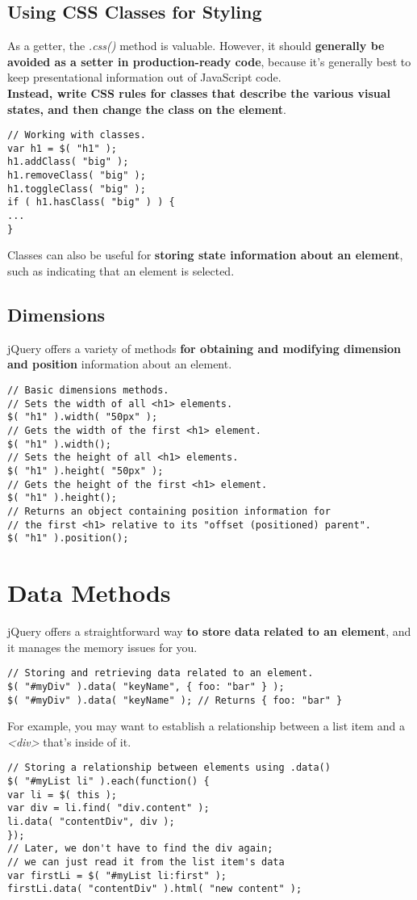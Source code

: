 \documentclass[10pt,letterpaper]{book}
\begin{document}
\subsection{Using CSS Classes for Styling}
As a getter, the \textit{.css()} method is valuable. However, it should \textbf{generally be avoided as a setter in production-ready code}, because it's generally best to keep presentational information out of JavaScript code.\\
\textbf{Instead, write CSS rules for classes that describe the various visual states, and then change the class on the element}.
\begin{lstlisting}
// Working with classes.
var h1 = $( "h1" );
h1.addClass( "big" );
h1.removeClass( "big" );
h1.toggleClass( "big" );
if ( h1.hasClass( "big" ) ) {
...
}
\end{lstlisting}
Classes can also be useful for \textbf{storing state information about an element}, such as indicating that an element is selected.
\subsection{Dimensions}
jQuery offers a variety of methods \textbf{for obtaining and modifying dimension and position} information about an element.
\begin{lstlisting}
// Basic dimensions methods.
// Sets the width of all <h1> elements.
$( "h1" ).width( "50px" );
// Gets the width of the first <h1> element.
$( "h1" ).width();
// Sets the height of all <h1> elements.
$( "h1" ).height( "50px" );
// Gets the height of the first <h1> element.
$( "h1" ).height();
// Returns an object containing position information for
// the first <h1> relative to its "offset (positioned) parent".
$( "h1" ).position();
\end{lstlisting}
\section{Data Methods}
 jQuery offers a straightforward way \textbf{to store data related to an element}, and it manages the memory issues for you.
\begin{lstlisting}
// Storing and retrieving data related to an element.
$( "#myDiv" ).data( "keyName", { foo: "bar" } );
$( "#myDiv" ).data( "keyName" ); // Returns { foo: "bar" }
\end{lstlisting}
For example, you may want to establish a relationship between a list item and a \textit{<div>} that's inside of it.
\begin{lstlisting}
// Storing a relationship between elements using .data()
$( "#myList li" ).each(function() {
var li = $( this );
var div = li.find( "div.content" );
li.data( "contentDiv", div );
});
// Later, we don't have to find the div again;
// we can just read it from the list item's data
var firstLi = $( "#myList li:first" );
firstLi.data( "contentDiv" ).html( "new content" );
\end{lstlisting}
\end{document}
